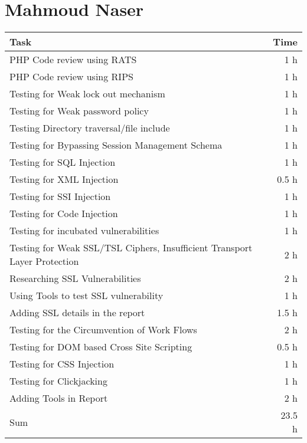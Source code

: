\clearpage
\section*{Mahmoud Naser}
\begin{table}[h!tpb]
  \centering
  \begin{tabularx}{\textwidth}{X r}
    \toprule
      Task & Time \\
    \midrule
    PHP Code review using RATS & 1 h \\
    PHP Code review using RIPS & 1 h \\
    Testing for Weak lock out mechanism	& 1 h \\
    Testing for Weak password policy & 1 h \\
    Testing Directory traversal/file include & 1 h \\
    Testing for Bypassing Session Management Schema & 1 h \\
    Testing for SQL Injection & 1 h \\
    Testing for XML Injection & 0.5 h \\
    Testing for SSI Injection & 1 h \\
    Testing for Code Injection & 1 h \\
    Testing for incubated vulnerabilities & 1 h \\
    Testing for Weak SSL/TSL Ciphers, Insufficient Transport Layer Protection & 2 h \\
    Researching SSL Vulnerabilities & 2 h \\
    Using Tools to test SSL vulnerability & 1 h \\
    Adding SSL details in the report  & 1.5 h \\
    Testing for the Circumvention of Work Flows & 2 h \\
    Testing for DOM based Cross Site Scripting & 0.5 h \\
    Testing for CSS Injection & 1 h \\
    Testing for Clickjacking & 1 h \\
    Adding Tools in Report & 2 h \\
    \midrule
      Sum & 23.5 h \\
    \bottomrule
  \end{tabularx}
\end{table}
